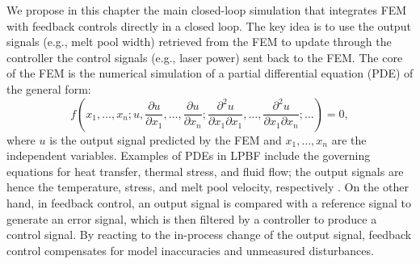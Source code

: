 \documentclass [11pt, proquest] {uwthesis}[2020/02/24]
\begin{document}
We propose in this chapter the main closed-loop simulation that integrates
FEM with feedback controls directly in a closed loop. The key idea
is to use the output signals (e.g., melt pool width) retrieved from
the FEM to update through the controller the control signals (e.g.,
laser power) sent back to the FEM. The core of the FEM is the numerical
simulation of a partial differential equation (PDE) of the general
form:
\[
f(x_{1},\ldots,x_{n};u,\frac{\partial u}{\partial x_{1}},\ldots,\frac{\partial u}{\partial x_{n}};\frac{\partial^{2}u}{\partial x_{1}\partial x_{1}},\ldots,\frac{\partial^{2}u}{\partial x_{1}\partial x_{n}};\ldots)=0,
\]
where $u$ is the output signal predicted by the FEM and $x_{1},\ldots,x_{n}$
are the independent variables. Examples of PDEs in LPBF include the
governing equations for heat transfer, thermal stress, and fluid flow;
the output signals are hence the temperature, stress, and melt pool
velocity, respectively \cite{luo2018survey,mukherjee2018heat}. On
the other hand, in feedback control, an output signal is compared
with a reference signal to generate an error signal, which is then
filtered by a controller to produce a control signal. By reacting
to the in-process change of the output signal, feedback control compensates
for model inaccuracies and unmeasured disturbances.
\end{document}
